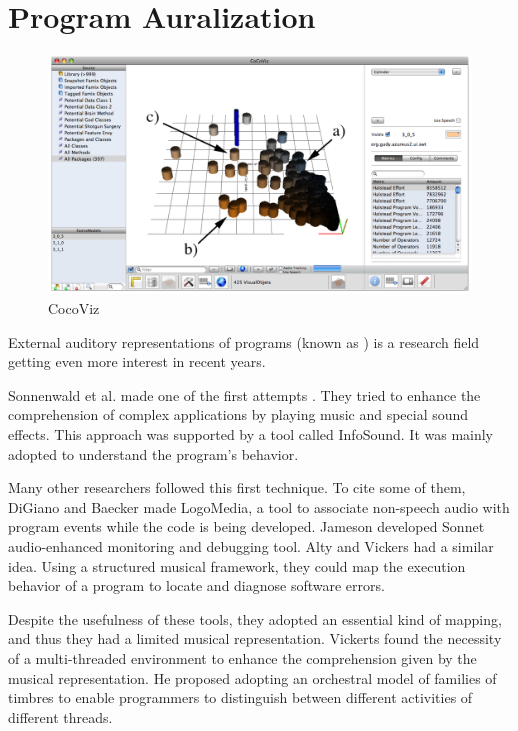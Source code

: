 \section{Program Auralization}
\begin{figure}[ht]
\centering
  \includegraphics[width=0.9\linewidth]{CocoViz.png} 
  \caption{CocoViz}
  \label{fig:cocoviz}
\end{figure}


External auditory representations of programs (known as ) is a research field getting even more interest in recent years.

Sonnenwald et al. made one of the first attempts \cite{Sonnenwald1990}.
They tried to enhance the comprehension of complex applications by playing music and special sound effects. 
This approach was supported by a tool called InfoSound.
It was mainly adopted to understand the program's behavior. 

Many other researchers followed this first technique. To cite some of them, DiGiano and Baecker \cite{DiGiano1993} made LogoMedia, a tool to associate non-speech
 audio with program events while the code is being developed. 
Jameson \cite{Jameson1994} developed Sonnet audio-enhanced monitoring and debugging tool.  
Alty and Vickers \cite{Vickers2003} had a similar idea. Using a structured musical framework, they could map the execution behavior of a program to locate and diagnose software errors. 
 
Despite the usefulness of these tools, they adopted an essential kind of mapping, and thus they had a limited musical representation. 
Vickerts \cite{Vickers2004} found the necessity of a multi-threaded environment to enhance the comprehension given by the musical representation. 
He proposed adopting an orchestral model of families of timbres to enable programmers to distinguish between different activities of different threads.

